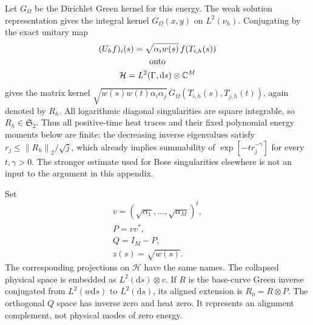 \documentclass[aps,pra,reprint,superscriptaddress,longbibliography]{revtex4-2}
\newcommand{\dd}{\mathrm d}
\newcommand{\norm}[1]{\left\lVert#1\right\rVert}
\begin{document}
Let $G_\Omega$ be the Dirichlet Green kernel for this energy.  The weak
solution representation gives the integral kernel $G_\Omega(x,y)$ on
$L^2(\nu_h)$.  Conjugating by the exact unitary map
\begin{equation}
\begin{gathered}
 (U_hf)_i(s)=\sqrt{\alpha_iw(s)}\,f(T_{i,h}(s))
 \\
\hbox{onto}\\
 \mathcal H=L^2(\Gamma,\dd s)\otimes\mathbb C^M
 \label{sgt:geo:unitary}
\end{gathered}
\end{equation}
gives the matrix kernel
$\sqrt{w(s)w(t)\alpha_i\alpha_j}\,
G_\Omega(T_{i,h}(s),T_{j,h}(t))$, again denoted by $R_h$.
All logarithmic diagonal singularities are square integrable, so
$R_h\in\mathfrak S_2$.  Thus all positive-time heat traces and their
fixed polynomial energy moments below are finite: the decreasing
inverse eigenvalues satisfy $r_j\leq\norm{R_h}_2/\sqrt j$, which already
implies summability of $\exp[-t r_j^{-\gamma}]$ for every $t,\gamma>0$.
The stronger estimate used for Bose singularities elsewhere is not an
input to the argument in this appendix.

Set
\[
\begin{gathered}
 v=(\sqrt{\alpha_1},\ldots,\sqrt{\alpha_M})^t,\\
 P=vv^*,\\
 Q=I_M-P,\\
 z(s)=\sqrt{w(s)}.
\end{gathered}
\]
The corresponding projections on $\mathcal H$ have the same names.
The collapsed physical space is embedded as $L^2(\dd s)\otimes v$.
If $R$ is the base-curve Green inverse conjugated from $L^2(w\dd s)$
to $L^2(\dd s)$, its aligned extension is $R_0=R\otimes P$.
The orthogonal $Q$ space has inverse zero and heat zero.  It represents
an alignment complement, not physical modes of zero energy.
\end{document}
